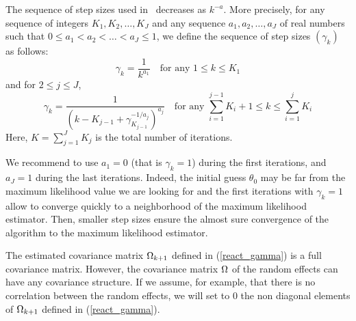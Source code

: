  The sequence of step sizes used in \monolix~decreases as $k^{-a}$. More precisely, for any sequence of integers $K_1,K_2,\ldots,K_J$ and any sequence $a_1,a_2,\ldots,a_J$ of real numbers such that $0\leq a_1 <a_2<\ldots<a_J\leq 1$, we define the sequence of step sizes $(\gamma_k)$ as follows:
\begin{equation} \label{stepsize1}
\gamma_k = \frac{1}{k^{a_1}} \quad \mbox{for any } 1\leq k \leq K_1
\end{equation}
and for $2\leq j \leq J$,
\begin{equation} \label{stepsize2}
\gamma_k = \frac{1}{\left(k - K_{j-1}+\gamma_{K_{j-1}}^{-1/a_j}\right) ^{a_j}} \quad \mbox{for any } \sum_{i=1}^{j-1} K_i +1\leq k \leq \sum_{i=1}^{j} K_i
\end{equation}
Here, $K=\sum_{j=1}^{J}K_j$ is the total number of iterations.

We recommend to use $a_1=0$ (that is $\gamma_k=1$) during the first iterations, and $a_J=1$ during the last iterations. Indeed, the initial guess  $\theta_0$ may  be far  from the maximum likelihood value  we are looking for and the first iterations with $\gamma_k=1$ allow to converge quickly to a neighborhood of the maximum likelihood estimator. Then, smaller step sizes ensure the almost sure convergence of the algorithm to the maximum likelihood estimator.




 The estimated covariance matrix ${{\Omega}_{k+1}}$ defined in (\ref{react_gamma}) is a full covariance matrix. However, the covariance matrix ${\Omega}$ of the random effects can have any covariance structure. If we assume, for example, that there is no correlation between the random effects, we will set to 0 the non diagonal elements of ${{\Omega}_{k+1}}$ defined in (\ref{react_gamma}).

